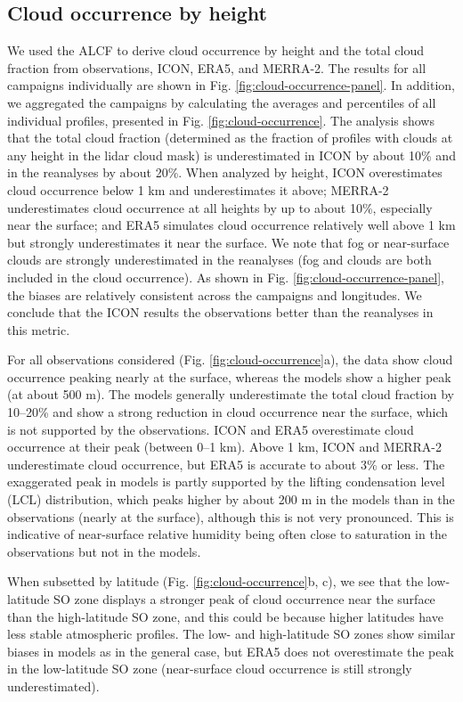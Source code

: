 \documentclass[draft]{agujournal2019}
\begin{document}
\subsection{Cloud occurrence by height}
\label{sec:cloud-occurrence}

We used the ALCF to derive cloud occurrence by height and the total cloud fraction from observations, ICON, ERA5, and MERRA-2. The results for all campaigns individually are shown in Fig. \ref{fig:cloud-occurrence-panel}. In addition, we aggregated the campaigns by calculating the averages and percentiles of all individual profiles, presented in Fig. \ref{fig:cloud-occurrence}. The analysis shows that the total cloud fraction (determined as the fraction of profiles with clouds at any height in the lidar cloud mask) is underestimated in ICON by about 10\% and in the reanalyses by about 20\%. When analyzed by height, ICON overestimates cloud occurrence below 1 km and underestimates it above; MERRA-2 underestimates cloud occurrence at all heights by up to about 10\%, especially near the surface; and ERA5 simulates cloud occurrence relatively well above 1 km but strongly underestimates it near the surface. We note that fog or near-surface clouds are strongly underestimated in the reanalyses (fog and clouds are both included in the cloud occurrence). As shown in Fig. \ref{fig:cloud-occurrence-panel}, the biases are relatively consistent across the campaigns and longitudes. We conclude that the ICON results the observations better than the reanalyses in this metric.

For all observations considered (Fig. \ref{fig:cloud-occurrence}a), the data show cloud occurrence peaking nearly at the surface, whereas the models show a higher peak (at about 500 m). The models generally underestimate the total cloud fraction by 10--20\% and show a strong reduction in cloud occurrence near the surface, which is not supported by the observations. ICON and ERA5 overestimate cloud occurrence at their peak (between 0--1 km). Above 1 km, ICON and MERRA-2 underestimate cloud occurrence, but ERA5 is accurate to about 3\% or less. The exaggerated peak in models is partly supported by the lifting condensation level (LCL) distribution, which peaks higher by about 200 m in the models than in the observations (nearly at the surface), although this is not very pronounced. This is indicative of near-surface relative humidity being often close to saturation in the observations but not in the models.

When subsetted by latitude (Fig. \ref{fig:cloud-occurrence}b, c), we see that the low-latitude SO zone displays a stronger peak of cloud occurrence near the surface than the high-latitude SO zone, and this could be because higher latitudes have less stable atmospheric profiles. The low- and high-latitude SO zones show similar biases in models as in the general case, but ERA5 does not overestimate the peak in the low-latitude SO zone (near-surface cloud occurrence is still strongly underestimated).
\end{document}
